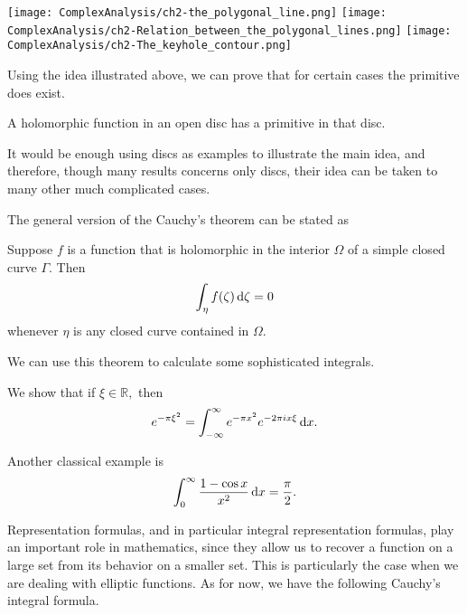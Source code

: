 \documentclass{chapter}
\begin{document}
            \begin{center}
                \texttt{[image: ComplexAnalysis/ch2-the\_polygonal\_line.png]}
                \texttt{[image: ComplexAnalysis/ch2-Relation\_between\_the\_polygonal\_lines.png]}
                \texttt{[image: ComplexAnalysis/ch2-The\_keyhole\_contour.png]}
            \end{center}

            Using the idea illustrated above, we can prove that for certain cases the primitive does exist.

            \begin{theorem}
                A holomorphic function in an open disc has a primitive in that disc.
                \label{theorem: exist primitive}
            \end{theorem}

            \begin{remark}
                It would be enough using discs as examples to illustrate the main idea, and therefore, though many results concerns only discs, their idea can be taken to many other much complicated cases.
            \end{remark}

            The general version of the Cauchy’s theorem can be stated as
            \begin{theorem}
                Suppose $f$ is a function that is holomorphic in the interior $\Omega$ of a simple closed curve $\Gamma$. Then \[\int_{\eta} f(\zeta) \mathop{}\!\mathrm{d} \zeta=0\] whenever $\eta$ is any closed curve contained in $\Omega$.
            \end{theorem}

            \bigskip
            We can use this theorem to calculate some sophisticated integrals.

            \begin{example}
                We show that if $\xi \in \mathbb{R},$ then \[e^{-\pi \xi^{2}}=\int_{-\infty}^{\infty} e^{-\pi x^{2}} e^{-2 \pi i x \xi} \mathop{}\!\mathrm{d} x.\]
            \end{example}

            \begin{example}
                Another classical example is \[\int_{0}^{\infty} \frac{1-\cos x}{x^{2}} \mathop{}\!\mathrm{d} x=\frac{\pi}{2}.\]
            \end{example}

            Representation formulas, and in particular integral representation formulas, play an important role in mathematics, since they allow us to recover a function on a large set from its behavior on a smaller set. This is particularly the case when we are dealing with elliptic functions. As for now, we have the following Cauchy’s integral formula.
\end{document}
